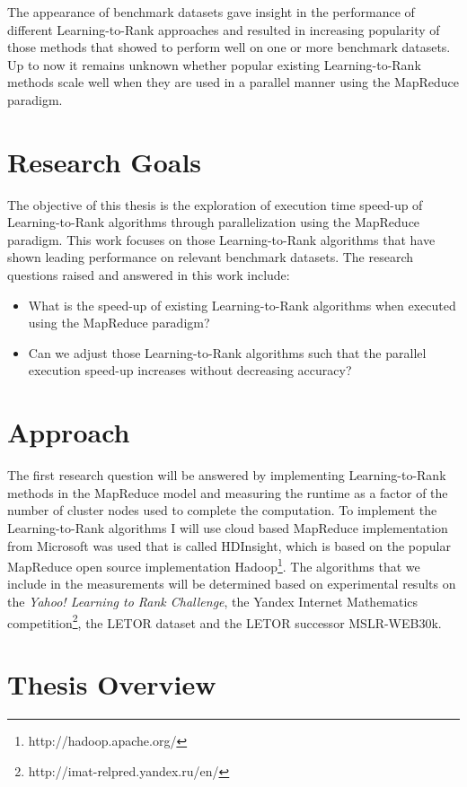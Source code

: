 The appearance of benchmark datasets gave insight in the performance of different Learning-to-Rank approaches and resulted in increasing popularity of those methods that showed to perform well on one or more benchmark datasets. Up to now it remains unknown whether popular existing Learning-to-Rank methods scale well when they are used in a parallel manner using the MapReduce paradigm.\\

\chapter{Research Goals}
The objective of this thesis is the exploration of execution time speed-up of Learning-to-Rank algorithms through parallelization using the MapReduce paradigm. 
This work focuses on those Learning-to-Rank algorithms that have shown leading performance on relevant benchmark datasets.
The research questions raised and answered in this work include:
\begin{itemize}
\item What is the speed-up of existing Learning-to-Rank algorithms when executed using the MapReduce paradigm?
\item Can we adjust those Learning-to-Rank algorithms such that the parallel execution speed-up increases without decreasing accuracy?
\end{itemize}

\chapter{Approach}
The first research question will be answered by implementing Learning-to-Rank methods in the MapReduce model and measuring the runtime as a factor of the number of cluster nodes used to complete the computation.
To implement the Learning-to-Rank algorithms I will use cloud based MapReduce implementation from Microsoft was used that is called HDInsight, which is based on the popular MapReduce open source implementation Hadoop\footnote{http://hadoop.apache.org/}.
The algorithms that we include in the measurements will be determined based on experimental results on the \emph{Yahoo! Learning to Rank Challenge}\cite{Chapelle2011a}, the Yandex Internet Mathematics competition\footnote{http://imat-relpred.yandex.ru/en/}, the LETOR\cite{Qin2010} dataset and the LETOR successor MSLR-WEB30k.


\chapter{Thesis Overview}

